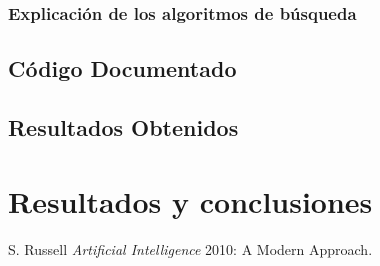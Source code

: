 \documentclass[letter, 10pt]{article}
\begin{document}
\subsubsection{Explicación de los algoritmos de búsqueda}


\subsection{Código Documentado}


\subsection{Resultados Obtenidos}



\section{Resultados y conclusiones}





\begin{thebibliography}{10} %
     S. Russell {\em Artificial Intelligence} 2010: A Modern Approach.
\end{thebibliography}

\end{document}
